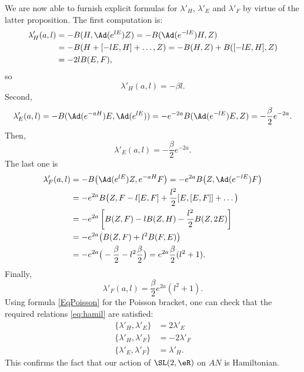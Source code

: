 We are now able to furnish explicit formulas for $\lambda'_H$, $\lambda'_E$ and $\lambda'_F$ by virtue of the latter proposition.  The first computation is:
\begin{equation}
	\begin{aligned}
		\lambda'_H(a,l) & =-B(H,\Ad(e^{lE})Z)
		=-B( \Ad(e^{-lE})H,Z )                    \\
		                & =-B(H+[-lE,H]+\ldots,Z)
		=-B(H,Z)+B([-lE,H],Z)                     \\
		                & =-2lB(E,F),
	\end{aligned}
\end{equation}
so
\begin{equation}   \label{EqlamHal}
	\lambda'_H(a,l)=-\beta l.
\end{equation}
Second,
\begin{equation}
	\lambda'_E(a,l)=-B(\Ad(e^{-aH})E,\Ad(e^{lE}))
	=-e^{-2a}B(\Ad(e^{-lE})E,Z)
	=-\frac{\beta}{2}e^{-2a}.
\end{equation}
Then,
\begin{equation}  \label{EqlamEal}
	\lambda'_E(a,l)=-\frac{\beta}{2}e^{-2a}.
\end{equation}
The last one is
\begin{equation}
	\begin{aligned}
		\lambda'_F(a,l) & =-B\big(  \Ad(e^{lE})Z,e^{-aH}F  \big)
		=-e^{2a}B\big(Z,  \Ad(e^{-lE})F   \big)                                                 \\
		                & =-e^{2a}B\big(Z, F-l[E,F] +\frac{l^2}{2} [E,[E,F]]+\ldots  \big)      \\
		                & =-e^{2a}\left[     B(Z,F)-lB(Z,H)-\frac{l^2}{2}B(Z,2E)        \right] \\
		                & =-e^{2a}\big(  B(Z,F)+l^2B(F,E)   \big)                               \\
		                & =-e^{2a}\big(  -\frac{\beta}{2}-l^2\frac{\beta}{2}   \big)
		=e^{2a}\frac{\beta}{2}(l^2+1).
	\end{aligned}
\end{equation}
Finally,
\begin{equation}  \label{EqlamFal}
	\lambda'_F(a,l)=\frac{\beta}{2}e^{2a}(l^2+1).
\end{equation}
Using formula \eqref{EqPoisson} for the Poisson bracket, one can check that the required relations \eqref{eq:hamil} are satisfied:
\begin{subequations}  \label{pg:explic_com_lamb}
	\begin{align}
		\{\lambda'_H,\lambda'_E\} & =2\lambda'_E  \\
		\{\lambda'_H,\lambda'_F\} & =-2\lambda'_F \\
		\{\lambda'_E,\lambda'_F\} & =\lambda'_H.
	\end{align}
\end{subequations}
This confirms the fact that our action of $\SL(2,\eR)$ on $AN$ is Hamiltonian.

